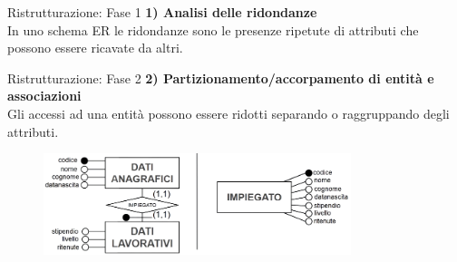 \begin{frame}{Ristrutturazione: Fase 1}
\textbf{1) Analisi delle ridondanze}
\\\vspace{2em}
In uno schema ER le ridondanze sono le presenze ripetute di attributi che possono essere ricavate da altri.
\end{frame}
%
\begin{frame}{Ristrutturazione: Fase 2}
\textbf{2) Partizionamento/accorpamento di entit\`a e associazioni}
\\\vspace{2em}
Gli accessi ad una entit\`a possono essere ridotti separando o raggruppando degli attributi.
\begin{figure}[h]
        \centering
        \includegraphics[width=0.8\textwidth]{img/i5.png}
    \end{figure}
\end{frame}
